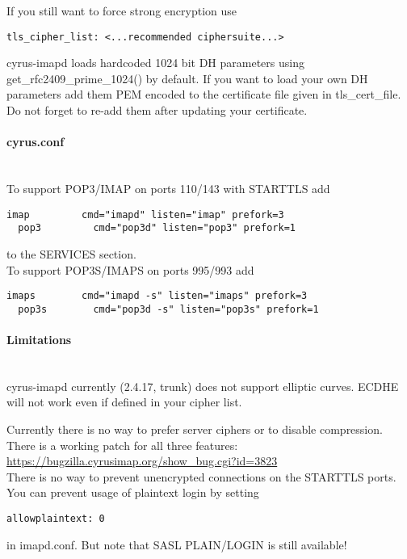 If you still want to force strong encryption use
\begin{lstlisting}[breaklines]
  tls_cipher_list: <...recommended ciphersuite...>
\end{lstlisting}

cyrus-imapd loads hardcoded 1024 bit DH parameters using get\_rfc2409\_prime\_1024() by default. If you want to load your own DH parameters add them PEM encoded to the certificate file given in tls\_cert\_file. Do not forget to re-add them after updating your certificate.

\paragraph*{cyrus.conf}\mbox{}\\

To support POP3/IMAP on ports 110/143 with STARTTLS add
\begin{lstlisting}[breaklines]
  imap         cmd="imapd" listen="imap" prefork=3
  pop3         cmd="pop3d" listen="pop3" prefork=1
\end{lstlisting}
to the SERVICES section.\\

To support POP3S/IMAPS on ports 995/993 add
\begin{lstlisting}[breaklines]
  imaps        cmd="imapd -s" listen="imaps" prefork=3
  pop3s        cmd="pop3d -s" listen="pop3s" prefork=1
\end{lstlisting}

\paragraph*{Limitations}\mbox{}\\

cyrus-imapd currently (2.4.17, trunk) does not support elliptic curves. ECDHE will not work even if defined in your cipher list.

Currently there is no way to prefer server ciphers or to disable compression.\\

There is a working patch for all three features:
\url{https://bugzilla.cyrusimap.org/show_bug.cgi?id=3823}\\

There is no way to prevent unencrypted connections on the STARTTLS ports. You can prevent usage of plaintext login by setting
\begin{lstlisting}[breaklines]
  allowplaintext: 0
\end{lstlisting}
in imapd.conf. But note that SASL PLAIN/LOGIN is still available!\\



